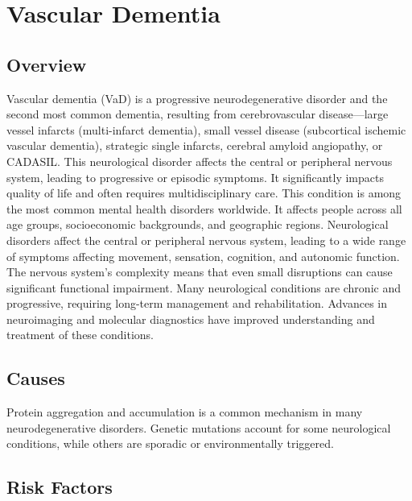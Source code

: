 \chapter{Vascular Dementia}
\label{sec:Vascular Dementia}

\section{Overview}
Vascular dementia (VaD) is a progressive neurodegenerative disorder and the second most common dementia, resulting from cerebrovascular disease---large vessel infarcts (multi-infarct dementia), small vessel disease (subcortical ischemic vascular dementia), strategic single infarcts, cerebral amyloid angiopathy, or CADASIL. This neurological disorder affects the central or peripheral nervous system, leading to progressive or episodic symptoms. It significantly impacts quality of life and often requires multidisciplinary care. This condition is among the most common mental health disorders worldwide. It affects people across all age groups, socioeconomic backgrounds, and geographic regions. Neurological disorders affect the central or peripheral nervous system, leading to a wide range of symptoms affecting movement, sensation, cognition, and autonomic function. The nervous system's complexity means that even small disruptions can cause significant functional impairment. Many neurological conditions are chronic and progressive, requiring long-term management and rehabilitation. Advances in neuroimaging and molecular diagnostics have improved understanding and treatment of these conditions.
\section{Causes}
Protein aggregation and accumulation is a common mechanism in many neurodegenerative disorders.  Genetic mutations account for some neurological conditions, while others are sporadic or environmentally triggered.   
\section{Risk Factors}

